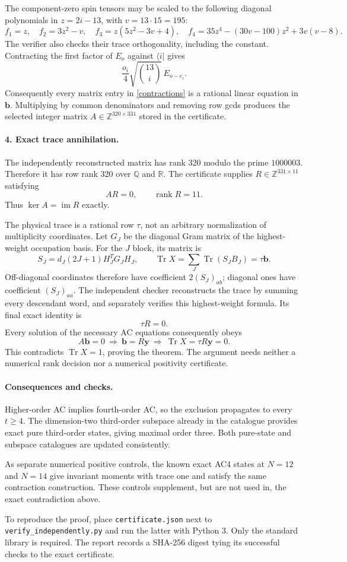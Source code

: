 \documentclass[11pt]{article}
\newcommand{\Tr}{\operatorname{Tr}}
\begin{document}
The component-zero spin tensors may be scaled to the following diagonal
polynomials in $z=2i-13$, with $v=13\cdot15=195$:
\[
 f_1=z,\quad f_2=3z^2-v,\quad
 f_3=z(5z^2-3v+4),\quad
 f_4=35z^4-(30v-100)z^2+3v(v-8).
\]
The verifier also checks their trace orthogonality, including the constant.
Contracting the first factor of $E_o$ against $\langle i|$ gives
\[
 \frac{o_i}{4}\sqrt{\binom{13}{i}}\,E_{o-e_i}.
\]
Consequently every matrix entry in \eqref{contractions} is a rational
linear equation in $\mathbf b$. Multiplying by common denominators
and removing row gcds produces the selected integer matrix
$A\in\mathbb Z^{320\times331}$ stored in the certificate.

\paragraph{4. Exact trace annihilation.}
The independently reconstructed matrix has rank 320 modulo the prime
$1000003$. Therefore it has row rank 320 over $\mathbb Q$ and $\mathbb R$.
The certificate supplies $R\in\mathbb Z^{331\times11}$ satisfying
\[
 AR=0,\qquad\operatorname{rank}R=11.
\]
Thus $\ker A=\operatorname{im}R$ exactly.

The physical trace is a rational row $\tau$, not an arbitrary
normalization of multiplicity coordinates. Let $G_J$ be the diagonal
Gram matrix of the highest-weight occupation basis. For the $J$ block,
its matrix is
\[
 S_J=d_J(2J+1)H_J^T G_J H_J,
 \qquad\Tr X=\sum_J\Tr(S_JB_J)=\tau\mathbf b.
\]
Off-diagonal coordinates therefore have coefficient $2(S_J)_{ab}$;
diagonal ones have coefficient $(S_J)_{aa}$.
The independent checker reconstructs the trace by summing every
descendant word, and separately verifies this highest-weight formula.
Its final exact identity is
\[
 \boxed{\tau R=0.}
\]
Every solution of the necessary AC equations consequently obeys
\[
 A\mathbf b=0\ \Longrightarrow\ \mathbf b=R\mathbf y
 \ \Longrightarrow\ \Tr X=\tau R\mathbf y=0.
\]
This contradicts $\Tr X=1$, proving the theorem. The argument needs
neither a numerical rank decision nor a numerical positivity certificate.

\paragraph{Consequences and checks.}
Higher-order AC implies fourth-order AC, so the exclusion propagates to
every $t\ge4$. The dimension-two third-order subspace already in the
catalogue provides exact pure third-order states, giving maximal order
three. Both pure-state and subspace catalogues are updated consistently.

As separate numerical positive controls, the known exact AC4 states at
$N=12$ and $N=14$ give invariant moments with trace one and satisfy the
same contraction construction. These controls supplement, but are not
used in, the exact contradiction above.

To reproduce the proof, place \texttt{certificate.json} next to
\texttt{verify\_independently.py} and run the latter with Python 3.
Only the standard library is required. The report records a SHA-256
digest tying its successful checks to the exact certificate.
\end{document}
